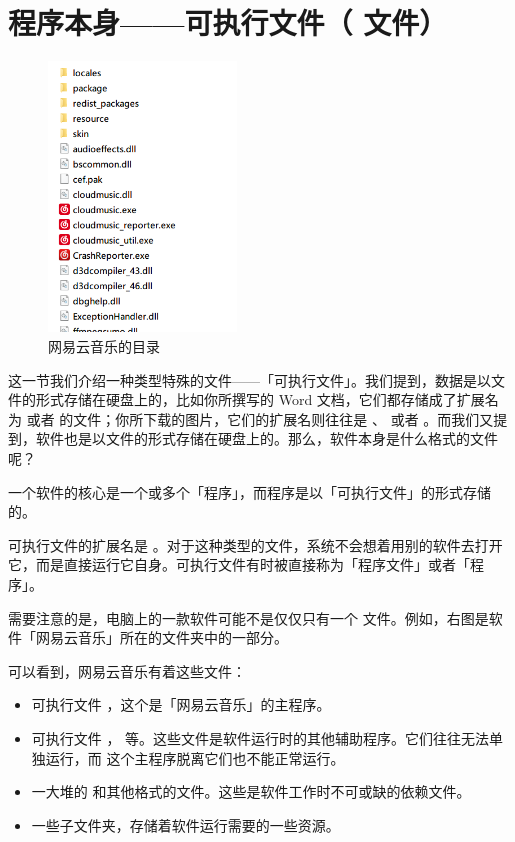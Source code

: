 {{\section{程序本身——可执行文件（ 文件）}

\begin{figure}
  \centering
  \includegraphics[width=5cm]{assets/basic/NCM_directory.png}
  \caption{网易云音乐的目录}
  \label{fig:NCM_directory}
\end{figure}

这一节我们介绍一种类型特殊的文件——「可执行文件」。我们提到，数据是以文件的形式存储在硬盘上的，比如你所撰写的 Word 文档，它们都存储成了扩展名为  或者  的文件；你所下载的图片，它们的扩展名则往往是  、  或者  。而我们又提到，软件也是以文件的形式存储在硬盘上的。那么，软件本身是什么格式的文件呢？

一个软件的核心是一个或多个「程序」，而程序是以「可执行文件」的形式存储的。

可执行文件的扩展名是  。对于这种类型的文件，系统不会想着用别的软件去打开它，而是直接运行它自身。可执行文件有时被直接称为「程序文件」或者「程序」。

需要注意的是，电脑上的一款软件可能不是仅仅只有一个  文件。例如，右图是软件「网易云音乐」所在的文件夹中的一部分。

可以看到，网易云音乐有着这些文件：

\begin{itemize}
  \item 可执行文件  ，这个是「网易云音乐」的主程序。
  \item 可执行文件 ， 等。这些文件是软件运行时的其他辅助程序。它们往往无法单独运行，而  这个主程序脱离它们也不能正常运行。
  \item 一大堆的  和其他格式的文件。这些是软件工作时不可或缺的依赖文件。
  \item 一些子文件夹，存储着软件运行需要的一些资源。
\end{itemize}

}}
